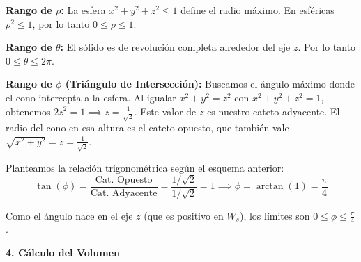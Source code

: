 \textbf{Rango de $\rho$:} La esfera $x^2 + y^2 + z^2 \leq 1$ define el radio máximo. En esféricas $\rho^2 \leq 1$, por lo tanto $0 \leq \rho \leq 1$.

\textbf{Rango de $\theta$:} El sólido es de revolución completa alrededor del eje $z$. Por lo tanto $0 \leq \theta \leq 2\pi$.

\textbf{Rango de $\phi$ (Triángulo de Intersección):} Buscamos el ángulo máximo donde el cono intercepta a la esfera. Al igualar $x^2 + y^2 = z^2$ con $x^2 + y^2 + z^2 = 1$, obtenemos $2z^2 = 1 \implies z = \frac{1}{\sqrt{2}}$. Este valor de $z$ es nuestro cateto adyacente. El radio del cono en esa altura es el cateto opuesto, que también vale $\sqrt{x^2+y^2} = z = \frac{1}{\sqrt{2}}$.

\begin{figure}[htbp]
    \centering
\end{figure}

Planteamos la relación trigonométrica según el esquema anterior:
\[
    \tan(\phi) = \frac{\text{Cat. Opuesto}}{\text{Cat. Adyacente}} = \frac{1/\sqrt{2}}{1/\sqrt{2}} = 1 \implies \phi = \arctan(1) = \frac{\pi}{4}
\]
    
Como el ángulo nace en el eje $z$ (que es positivo en $W_s$), los límites son $0 \leq \phi \leq \frac{\pi}{4}$.

\vspace{0.3cm}
\textbf{4. Cálculo del Volumen}

